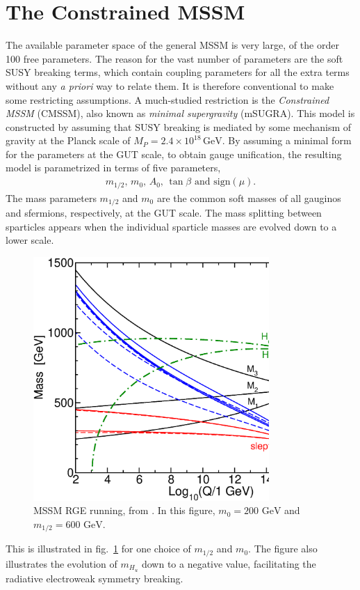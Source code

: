 \documentclass[twoside,english]{uiofysmaster}
\begin{document}
\section{The Constrained MSSM}
\label{sec:cmssm}
The available parameter space of the general MSSM is very large, of the order 100 free parameters. The reason for the vast number of parameters are the soft SUSY breaking terms, which contain coupling parameters for all the extra terms without any {\it a priori} way to relate them. It is therefore conventional to make some restricting assumptions. A much-studied restriction is the {\it Constrained MSSM} (CMSSM), also known as {\it minimal supergravity} (mSUGRA). This model is constructed by assuming that SUSY breaking is mediated by some mechanism of gravity at the Planck scale of $M_P = 2.4\times 10^{18} \, \mathrm{GeV}$. By assuming a minimal form for the parameters at the GUT scale, to obtain gauge unification, the resulting model is parametrized in terms of five parameters,
\begin{align}
	m_{1/2}, \, m_{0}, \, A_0, \, \tan\beta \,\, \mathrm{and} \,\, \mathrm{sign}(\mu).
\end{align}
The mass parameters $m_{1/2}$ and $m_0$ are the common soft masses of all gauginos and sfermions, respectively, at the GUT scale. The mass splitting between sparticles appears when the individual sparticle masses are evolved down to a lower scale.
\begin{figure}[hbt]
	\centering
	\includegraphics[width=0.8\textwidth]{figures/susyintro/MSSMrun.eps}
	\caption{MSSM RGE running, from \cite{Martin:1997ns}. In this figure, $m_0 = 200 \,\,\mathrm{GeV}$ and $m_{1/2}= 600 \,\,\mathrm{GeV}$.}
	\label{fig:mssm_rgerun}
\end{figure}
This is illustrated in fig.\ \ref{fig:mssm_rgerun} for one choice of $m_{1/2}$ and $m_0$. The figure also illustrates the evolution of $m_{H_u}$ down to a negative value, facilitating the radiative electroweak symmetry breaking.
\end{document}
